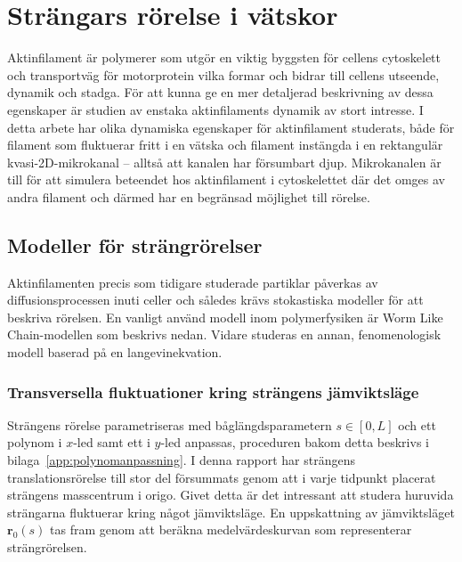 \chapter{Strängars rörelse i vätskor}

Aktinfilament är polymerer som utgör en viktig byggsten för cellens cytoskelett och transportväg för motorprotein vilka formar och bidrar till cellens utseende, dynamik och stadga. För att kunna ge en mer detaljerad beskrivning av dessa egenskaper är studien av enstaka aktinfilaments dynamik av stort intresse. I detta arbete har olika dynamiska egenskaper för aktinfilament studerats, både för filament som fluktuerar fritt i en vätska och filament instängda i en rektangulär kvasi-2D-mikrokanal -- alltså att kanalen har försumbart djup. Mikrokanalen är till för att simulera beteendet hos aktinfilament i cytoskelettet där det omges av andra filament och därmed har en begränsad möjlighet till rörelse.

\section{Modeller för strängrörelser}

Aktinfilamenten precis som tidigare studerade partiklar påverkas av diffusionsprocessen inuti celler och således krävs stokastiska modeller för att beskriva rörelsen. En vanligt använd modell inom polymerfysiken är Worm Like Chain-modellen som beskrivs nedan. Vidare studeras en annan, fenomenologisk modell baserad på en langevinekvation. 

\subsection{Transversella fluktuationer kring strängens jämviktsläge}
Strängens rörelse parametriseras med båglängdsparametern $s\in[0,L]$ och ett polynom i $x$-led samt ett i $y$-led anpassas, proceduren bakom detta beskrivs i bilaga~\ref{app:polynomanpassning}. I denna rapport har strängens translationsrörelse till stor del försummats genom att i varje tidpunkt placerat strängens masscentrum i origo. Givet detta är det intressant att studera huruvida strängarna fluktuerar kring något jämviktsläge. En uppskattning av jämviktsläget $\mathbf{r}_0(s)$ tas fram genom att beräkna medelvärdeskurvan som representerar strängrörelsen. 

